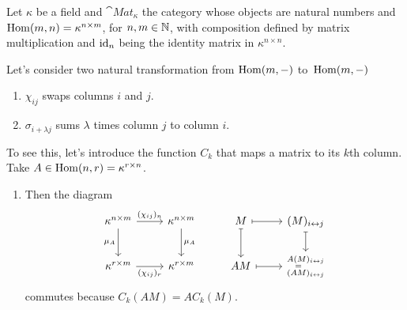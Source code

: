 \begin{xmpl}
    Let $\kappa$ be a field and $\cat{Mat}_\kappa$ the category whose objects are natural numbers and ${\rm Hom}(m,n)=\kappa^{n\times m}$, for $n,m\in\mathbb{N}$, with composition defined by matrix multiplication and $\text{\rm id}_n$ being the identity matrix in $\kappa^{n\times n}$.

    Let's consider two natural transformation from ${\rm Hom}(m,-)$ to~${\rm Hom}(m,-)$
    \begin{enumerate}[\rm a)]
        \item $\chi_{ij}$ swaps columns $i$ and $j$.
        \item $\sigma_{i+\lambda j}$ sums $\lambda$ times column $j$ to column $i$. 
    \end{enumerate}
    To see this, let's introduce the function $C_k$ that maps a matrix to its $k$th column. Take $A\in{\rm Hom}(n,r)=\kappa^{r\times n}$.
    \begin{enumerate}[\rm a)]
        \item Then the diagram
        $$
            \begin{tikzcd}
                \kappa^{n\times m}
                        \arrow[r,"(\chi_{ij})_n"]
                        \arrow[d,"\mu_A"']
                    &\kappa^{n\times m}
                        \arrow[d,"\mu_A"]
                    &M
                        \arrow[r,mapsto]
                        \arrow[d,mapsto]&(M)_{i\leftrightarrow j}
                        \arrow[d,mapsto]\\
                \kappa^{r\times m}
                        \arrow[r,"(\chi_{ij})_r"']
                    &\kappa^{r\times m}
                    &AM
                        \arrow[r,mapsto]
                    &\substack{
                        A(M)_{i\leftrightarrow j}\\
                        =\hphantom{{}_{i\leftrightarrow j}}\\
                        (AM)_{i\leftrightarrow j}
                    }
            \end{tikzcd}
        $$
        commutes because $C_k(AM)=AC_k(M)$.


\end{enumerate}
\end{xmpl}
